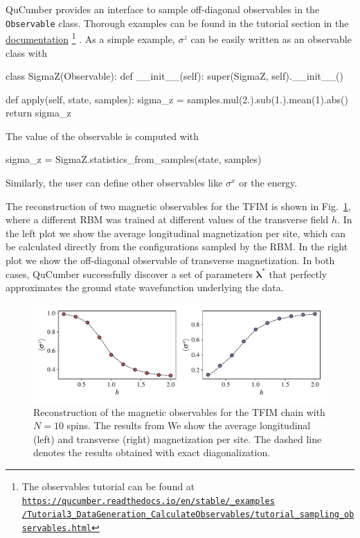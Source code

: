\documentclass[submission, Phys, hidelinks]{SciPost}
\begin{document}
		QuCumber provides an interface to sample off-diagonal observables in the \verb|Observable| class. Thorough examples can be found in the tutorial section in the \href{https://qucumber.readthedocs.io/en/stable/}{documentation}
		\footnote{The observables tutorial can be found at 
			\href{https://qucumber.readthedocs.io/en/stable/\_examples/Tutorial3\_DataGeneration\_CalculateObservables/tutorial\_sampling\_observables.html
        }{\texttt{https://qucumber.readthedocs.io/en/stable/\_examples\\/Tutorial3\_DataGeneration\_CalculateObservables/tutorial\_sampling\_observables.html}}
		}
        . As a simple example, $\sigma^z$ can be easily written as an observable class with
\begin{python}
class SigmaZ(Observable):
	def __init__(self):
		super(SigmaZ, self).__init__()

	def apply(self, state, samples):
		sigma_z = samples.mul(2.).sub(1.).mean(1).abs()
		return sigma_z
\end{python}
		The value of the observable is computed with 
\begin{python}
sigma_z = SigmaZ.statistics_from_samples(state, samples)
\end{python}
		Similarly, the user can define other observables like $\sigma^x$ or the energy. 

		 The reconstruction of two magnetic observables for the TFIM is shown in Fig.~\ref{tfim_magn}, where a different RBM was trained at different values of the transverse field $h$. In the left plot we show the average longitudinal magnetization per site, which can be calculated directly from the configurations sampled by the RBM. In the right plot we show the off-diagonal observable of transverse magnetization. In both cases, QuCumber successfully discover a set of parameters $\bm{\lambda}^*$ that perfectly approximates the ground state wavefunction underlying the data.

		\begin{figure}[hbt]
			\centering{}
			\includegraphics[width=\columnwidth]{plots/obs.pdf}
			\caption{\label{tfim_magn} Reconstruction of the magnetic observables for the TFIM chain with $N=10$ spins. The results from We show the average longitudinal (left) and transverse (right) magnetization per site. The dashed line denotes the results obtained with exact diagonalization.}
		\end{figure}
\end{document}

